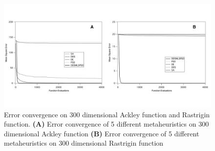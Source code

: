 \documentclass[12pt]{article}
\begin{document}






\clearpage

\renewcommand\thefigure{S\arabic{figure}}
\renewcommand\thetable{T\arabic{table}}
\renewcommand\thepage{S-\arabic{page}}
\renewcommand\theequation{S\arabic{equation}}

\begin{figure}[H]
\centering
\includegraphics[width=1.02\textwidth,height=0.5\textheight]{./figs/Figure_6_Ackley_Rast}
\caption{Error convergence on 300 dimensional Ackley function and Rastrigin function. \textbf {(A)} Error convergence of 5 different metaheuristics on 300 dimensional Ackley function \textbf {(B)} Error convergence of 5 different metaheuristics on 300 dimensional Rastrigin function
}\label{fig-testfunctions}
\end{figure}
\end{document}
